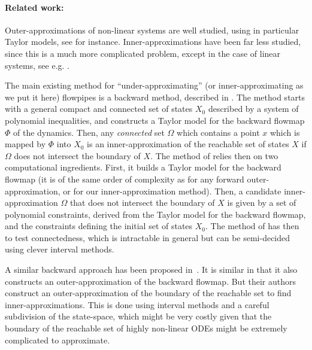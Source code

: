 \documentclass{sig-alternate-05-2015} %
\newcommand\ForAuthors[1]%
 {\par\smallskip                     %
  \begin{center}%
   \fbox%
   {\parbox{0.9\linewidth}%
    {\raggedright\sc--- #1}%
   }%
  \end{center}%
  \par\smallskip                     %
 }
\newcommand{\addTODO}[1]{\addcontentsline{tdo}{toc}{#1}}
\newcommand{\TODO}[1]{{\bf{\scriptsize #1}\addTODO{#1}}}
\newcommand{\SP}[1]{\TODO{Sylvie : #1}}
\begin{document}
\paragraph{Related work:}
\label{relatedwork}



Outer-approximations of non-linear systems are well studied, using in particular Taylor
models, see \cite{Taylor07} for instance. Inner-approximations have been far less studied, 
since this is a much more complicated problem, except in the case of linear systems, 
see e.g. \cite{LeGuernic09,GirardLinear06}.

The main existing method for ``under-approximating'' (or inner-approximating as we put it 
here) flowpipes is a backward method, described in \cite{Underapproxflowpipes}. 
The method starts with a general
compact and connected 
set of states $X_0$ described by a system of polynomial inequalities, and constructs a Taylor
model for the backward flowmap $\Phi$ of the dynamics. Then, any {\em connected} set $\Omega$
which contains a point 
$x$ which is mapped by $\Phi$ into $X_0$ is an inner-approximation of the reachable set
of states $X$ if $\Omega$ does not intersect the boundary of 
$X$. The method of \cite{Underapproxflowpipes}
relies then on two computational ingredients. 
First, it builds a Taylor model for the backward flowmap (it is of the same order of complexity
as for any forward outer-approximation, or for our inner-approximation method). 
Then, a candidate inner-approximation $\Omega$ that does not intersect the boundary of $X$
is given by a set of polynomial constraints, derived
from the Taylor model for the backward flowmap, and the constraints defining the initial set
of states $X_0$. The method of \cite{Underapproxflowpipes} has then to test connectedness, which is intractable in general but
can be semi-decided using clever interval methods.

A similar backward approach %
has been proposed in~\cite{underapprox16}. It is similar in that it also constructs 
an outer-approximation of the backward flowmap. But their authors construct an outer-approximation
of the boundary of the reachable set to find inner-approximations. This is done using 
interval methods and a careful subdivision of the state-space, which might be very costly
given that the boundary of the reachable set of highly non-linear ODEs might be extremely 
complicated to approximate. 
\end{document}
